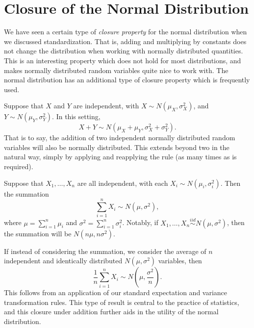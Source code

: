 \documentclass[
  letterpaper,
  DIV=11,
  numbers=noendperiod]{scrreprt}
\theoremstyle{definition}
\theoremstyle{definition}
\theoremstyle{definition}
\theoremstyle{remark}
\begin{document}
\section{Closure of the Normal
Distribution}\label{closure-of-the-normal-distribution}

We have seen a certain type of \emph{closure property} for the normal
distribution when we discussed standardization. That is, adding and
multiplying by constants does not change the distribution when working
with normally distributed quantities. This is an interesting property
which does not hold for most distributions, and makes normally
distributed random variables quite nice to work with. The normal
distribution has an additional type of closure property which is
frequently used.

Suppose that \(X\) and \(Y\) are independent, with
\(X\sim N(\mu_X, \sigma_X^2)\), and \(Y\sim N(\mu_Y, \sigma_Y^2)\). In
this setting, \[X+Y\sim N(\mu_X+\mu_Y, \sigma_X^2 + \sigma_Y^2).\] That
is to say, the addition of two independent normally distributed random
variables will also be normally distributed. This extends beyond two in
the natural way, simply by applying and reapplying the rule (as many
times as is required).

\begin{tcolorbox}[enhanced jigsaw, coltitle=black, colframe=quarto-callout-tip-color-frame, colbacktitle=quarto-callout-tip-color!10!white, bottomrule=.15mm, opacitybacktitle=0.6, colback=white, toptitle=1mm, arc=.35mm, leftrule=.75mm, bottomtitle=1mm, opacityback=0, breakable, rightrule=.15mm, title={Closure of the Normal Distribution}, left=2mm, titlerule=0mm, toprule=.15mm]

Suppose that \(X_1, \dots, X_n\) are all independent, with each
\(X_i \sim N(\mu_i, \sigma_i^2)\). Then the summation
\[\sum_{i=1}^n X_i \sim N(\mu, \sigma^2),\] where
\(\mu = \sum_{i=1}^n \mu_i\) and \(\sigma^2 = \sum_{i=1}^n \sigma_i^2\).
Notably, if \(X_1,\dots,X_n \stackrel{iid}{\sim} N(\mu,\sigma^2)\), then
the summation will be \(N(n\mu, n\sigma^2)\).

\end{tcolorbox}

If instead of considering the summation, we consider the average of
\(n\) independent and identically distributed \(N(\mu,\sigma^2)\)
variables, then
\[\frac{1}{n}\sum_{i=1}^n X_i \sim N(\mu, \frac{\sigma^2}{n}).\] This
follows from an application of our standard expectation and variance
transformation rules. This type of result is central to the practice of
statistics, and this closure under addition further aids in the utility
of the normal distribution.
\end{document}
